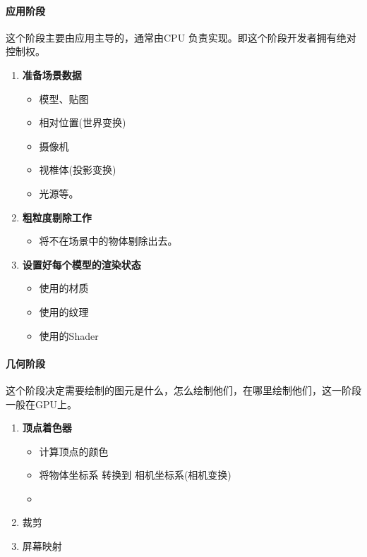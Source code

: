 \documentclass[UTF8,a4paper,12pt]{ctexbook}
\begin{document}
		\paragraph{应用阶段}
			这个阶段主要由应用主导的，通常由CPU 负责实现。即这个阶段开发者拥有绝对控制权。
			\begin{enumerate}
				\item \textbf{准备场景数据}
					\begin{itemize}
						\item 模型、贴图
						\item 相对位置(世界变换)
						\item 摄像机
						\item 视椎体(投影变换)
						\item 光源等。
					\end{itemize}
				\item \textbf{粗粒度剔除工作}
					\begin{itemize}
						\item 将不在场景中的物体剔除出去。
					\end{itemize}
				\item \textbf{设置好每个模型的渲染状态}
					\begin{itemize}
						\item 使用的材质
						\item 使用的纹理
						\item 使用的Shader
					\end{itemize}
			\end{enumerate}
		
		\paragraph{几何阶段}
			这个阶段决定需要绘制的图元是什么，怎么绘制他们，在哪里绘制他们，这一阶段一般在GPU上。
			
			\begin{enumerate}
				\item \textbf{顶点着色器}
					\begin{itemize}
						\item 计算顶点的颜色
						\item 将物体坐标系 转换到 相机坐标系(相机变换)
						\item 
					\end{itemize}
				\item 裁剪
				\item 屏幕映射
			\end{enumerate}
		
\end{document}
